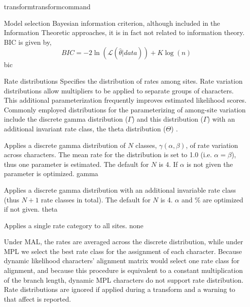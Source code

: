 \begin{command}{transform}{transformcommand}
\begin{arguments}
\begin {argumentgroup}{Model selection}
{ Bayesian information criterion, although included in
the Information Theoretic approaches, it is in fact not
related to information theory. BIC is given by,
\begin{equation*}
BIC = - 2 \ln(\mathcal{L}(\hat{\theta}|data)) + K \log(n)
\end{equation*}}
{bic}
\end{argumentgroup}


\begin{argumentgroup}{Rate distributions}
Specifies the distribution of rates among sites. Rate
variation distributions allow multipliers to be applied to
separate groups of characters. This additional parameterization
frequently improves estimated likelihood scores.
Commonly employed distributions for the parameterizing of 
among-site variation include the discrete gamma distribution ($\Gamma$)
\cite{yang1994a} and this distribution ($\Gamma$) with an additional
invariant rate class, the theta distribution ($\Theta$)
\cite{gu1995}. 


{Applies a discrete gamma distribution of $N$ classes,
$\gamma(\alpha,\beta)$, of rate variation across
characters. The mean rate for the distribution is set to
1.0 (i.e. $\alpha = \beta$), thus one parameter is
estimated. The default for $N$ is 4. If $\alpha$ is
not given the parameter is optimized.}
{gamma}

{Applies a discrete gamma distribution with an additional
invariable rate class (thus $N+1$ rate classes in total).
The default for $N$ is 4. $\alpha$ and \% are optimized if
not given.}
{theta}

{Applies a single rate category to all sites.}
{none}

\begin{statement}
Under MAL, the rates are averaged across the
discrete distribution, while under MPL we select the best
rate class for the assignment of each character. Because
dynamic likelihood characters' alignment matrix would select
one rate class for alignment, and because this procedure is equivalent to a
constant multiplication of the branch length, dynamic MPL
characters do not support rate distribution. Rate distributions are
ignored if applied during a transform and a
warning to that affect is reported.
\end{statement}


\end{argumentgroup}
\end{arguments}
\end{command}

